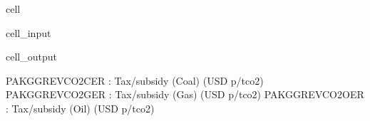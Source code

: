 \documentclass[letterpaper,10pt,english]{jupyterBook}
\begin{document}
\begin{sphinxuseclass}{cell}\begin{sphinxVerbatimInput}

\begin{sphinxuseclass}{cell_input}
\begin{sphinxVerbatim}[commandchars=\\\{\}]
   \PYG{p}{[}  \PYG{p}{]}
    \PYG{p}{[}\PYG{p}{]}
    
\end{sphinxVerbatim}

\end{sphinxuseclass}\end{sphinxVerbatimInput}
\begin{sphinxVerbatimOutput}

\begin{sphinxuseclass}{cell_output}
\begin{sphinxVerbatim}[commandchars=\\\{\}]
PAKGGREVCO2CER : Tax/subsidy (Coal) (USD p/tco2)
PAKGGREVCO2GER : Tax/subsidy (Gas) (USD p/tco2)
PAKGGREVCO2OER : Tax/subsidy (Oil) (USD p/tco2)
\end{sphinxVerbatim}

\end{sphinxuseclass}\end{sphinxVerbatimOutput}

\end{sphinxuseclass}
\end{document}
